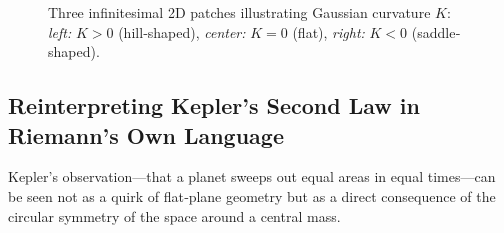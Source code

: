 \begin{figure}[H]
    \centering
    \caption{%
    Three infinitesimal 2D patches illustrating Gaussian curvature \(K\):
    \emph{left:} \(K>0\) (hill‐shaped), 
    \emph{center:} \(K=0\) (flat), 
    \emph{right:} \(K<0\) (saddle‐shaped).}
\end{figure}







\subsection{Reinterpreting Kepler’s Second Law in Riemann’s Own Language}

Kepler’s observation—that a planet sweeps out equal areas in equal times—can be seen not as a quirk of flat‐plane geometry but as a direct consequence of the circular symmetry of the space around a central mass.

